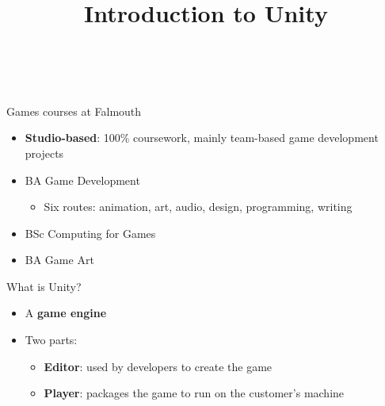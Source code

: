\usepackage{../../beamerthemeFalmouthGamesAcademy}
\usepackage{multimedia}
\graphicspath{ {../../} }


\usepackage[normalem]{ulem}
\usepackage{wasysym}

\usepackage{pdfpages}

\usetikzlibrary{arrows,automata}




\title{Introduction to Unity}
\subtitle{\modulecode\ \moduletitle}

\frame{\titlepage} 

\begin{frame}{Games courses at Falmouth}
	\begin{itemize}
		\pause\item \textbf{Studio-based}: 100\% coursework, mainly team-based game development projects
		\pause\item BA Game Development
			\begin{itemize}
				\pause\item Six routes: animation, art, audio, design, programming, writing
			\end{itemize}
		\pause\item BSc Computing for Games
		\pause\item BA Game Art
	\end{itemize}
\end{frame}

\begin{frame}{What is Unity?}
	\begin{itemize}
		\pause\item A \textbf{game engine}
		\pause\item Two parts:
			\begin{itemize}
				\pause\item \textbf{Editor}: used by developers to create the game
				\pause\item \textbf{Player}: packages the game to run on the customer's machine
			\end{itemize}
	\end{itemize}
\end{frame}

